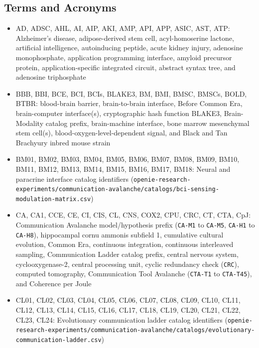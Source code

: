 \documentclass[10pt,letterpaper]{article}
\providecommand{\tightlist}{\setlength{\itemsep}{1pt}\setlength{\parskip}{0pt}}
\begin{document}
\subsection{Terms and Acronyms}\label{terms-and-acronyms}

\begin{itemize}
\tightlist
\item
  AD, ADSC, AHL, AI, AIP, AKI, AMP, API, APP, ASIC, AST, ATP:
  Alzheimer's disease, adipose-derived stem cell, acyl-homoserine
  lactone, artificial intelligence, autoinducing peptide, acute kidney
  injury, adenosine monophosphate, application programming interface,
  amyloid precursor protein, application-specific integrated circuit,
  abstract syntax tree, and adenosine triphosphate
\item
  BBB, BBI, BCE, BCI, BCIs, BLAKE3, BM, BMI, BMSC, BMSCs, BOLD, BTBR:
  blood-brain barrier, brain-to-brain interface, Before Common Era,
  brain-computer interface(s), cryptographic hash function BLAKE3,
  Brain-Modality catalog prefix, brain-machine interface, bone marrow
  mesenchymal stem cell(s), blood-oxygen-level-dependent signal, and
  Black and Tan Brachyury inbred mouse strain
\item
  BM01, BM02, BM03, BM04, BM05, BM06, BM07, BM08, BM09, BM10, BM11,
  BM12, BM13, BM14, BM15, BM16, BM17, BM18: Neural and paracrine
  interface catalog identifiers
  (\texttt{openie-\allowbreak{}research-\allowbreak{}experiments/\allowbreak{}communication-\allowbreak{}avalanche/\allowbreak{}catalogs/\allowbreak{}bci-\allowbreak{}sensing-\allowbreak{}modulation-\allowbreak{}matrix.\allowbreak{}csv})
\item
  CA, CA1, CCE, CE, CI, CIS, CL, CNS, COX2, CPU, CRC, CT, CTA, CpJ:
  Communication Avalanche model/hypothesis prefix (\texttt{CA-M1} to
  \texttt{CA-M5}, \texttt{CA-H1} to \texttt{CA-H8}), hippocampal cornu
  ammonis subfield 1, cumulative cultural evolution, Common Era,
  continuous integration, continuous interleaved sampling, Communication
  Ladder catalog prefix, central nervous system, cyclooxygenase-2,
  central processing unit, cyclic redundancy check (\texttt{CRC}),
  computed tomography, Communication Tool Avalanche (\texttt{CTA-T1} to
  \texttt{CTA-T45}), and Coherence per Joule
\item
  CL01, CL02, CL03, CL04, CL05, CL06, CL07, CL08, CL09, CL10, CL11,
  CL12, CL13, CL14, CL15, CL16, CL17, CL18, CL19, CL20, CL21, CL22,
  CL23, CL24: Evolutionary communication ladder catalog identifiers
  (\texttt{openie-\allowbreak{}research-\allowbreak{}experiments/\allowbreak{}communication-\allowbreak{}avalanche/\allowbreak{}catalogs/\allowbreak{}evolutionary-\allowbreak{}communication-\allowbreak{}ladder.\allowbreak{}csv})

\end{itemize}
\end{document}
